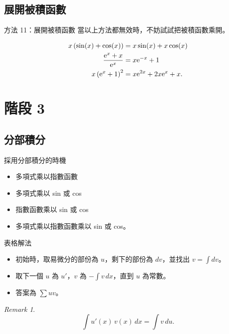 \documentclass{beamer}
\newcommand{\e}{\textup e}
\theoremstyle{remark}
\newtheorem{remark}{Remark}
\begin{document}
\subsection{展開被積函數}
\begin{frame}{方法 11：展開被積函數}
  當以上方法都無效時，不妨試試把被積函數乘開。
  \begin{example}
    \begin{align*}
      x \left( \sin(x) + \cos(x) \right) &= x \sin(x) + x \cos(x)\\
      \frac{\e^x + x}{\e^x} &= x \e^{-x} + 1\\
      x \left( \e^x + 1 \right)^2 &= x \e^{2x} + 2x \e^x + x.
    \end{align*}
  \end{example}
\end{frame}

\section{階段 3}
\subsection{分部積分}
\begin{frame}{採用分部積分的時機}
  \begin{itemize}
    \item 多項式乘以指數函數
    \item 多項式乘以 sin 或 cos
    \item 指數函數乘以 sin 或 cos
    \item 多項式乘以指數函數乘以 sin 或 cos。
  \end{itemize}
\end{frame}

\begin{frame}{表格解法}
  \begin{theorem}
    \begin{itemize}
      \item 初始時，取易微分的部份為 $u$，剩下的部份為 $dv$，並找出 $v = \int dv$。
      \item 取下一個 $u$ 為 $u'$，$v$ 為 $-\int v\,dx$，直到 $u$ 為常數。
      \item 答案為 $\sum uv$。
    \end{itemize}
  \end{theorem}
  \begin{remark}
    \[\int u'(x)\,v(x)\,dx = \int v\,du.\]
  \end{remark}
\end{frame}
\end{document}
